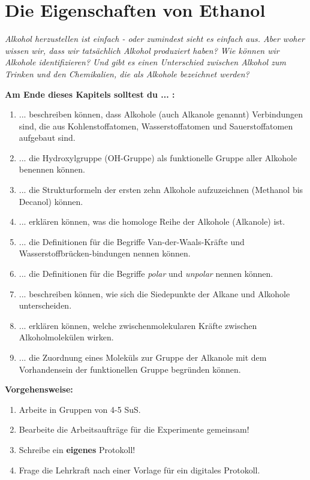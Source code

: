 \documentclass{scrartcl}  %
\begin{document}
\newpage

		\section{Die Eigenschaften von Ethanol}

			\textit{Alkohol herzustellen ist einfach - oder zumindest sieht es einfach aus. Aber woher wissen wir, dass wir tatsächlich Alkohol produziert haben? Wie können wir Alkohole identifizieren? Und gibt es einen Unterschied zwischen Alkohol zum Trinken und den Chemikalien, die als Alkohole bezeichnet werden?} \newline
			
			\begin{minipage}{0.7\textwidth}
				\noindent \textbf{Am Ende dieses Kapitels solltest du ... :}
				\begin{enumerate}
					\item ... beschreiben können, dass Alkohole (auch Alkanole genannt) Verbindungen sind, die aus Kohlenstoffatomen, Wasserstoffatomen und Sauerstoffatomen aufgebaut sind.
					\item ... die Hydroxylgruppe (OH-Gruppe) als funktionelle Gruppe aller Alkohole benennen können.
					\item ... die Strukturformeln der ersten zehn Alkohole aufzuzeichnen (Methanol bis Decanol) können. 
					\item ... erklären können, was die homologe Reihe der Alkohole (Alkanole) ist.
					\item ... die Definitionen für die Begriffe Van-der-Waals-Kräfte und Wasserstoffbrücken-bindungen nennen können.
					\item ... die Definitionen für die Begriffe \textit{polar} und \textit{unpolar} nennen können.
					\item ... beschreiben können, wie sich die Siedepunkte der Alkane und Alkohole unterscheiden.
					\item ... erklären können, welche zwischenmolekularen Kräfte zwischen Alkoholmolekülen wirken.
					\item ... die Zuordnung eines Moleküls zur Gruppe der Alkanole mit dem Vorhandensein der funktionellen Gruppe begründen können.
				\end{enumerate}	
			
				\noindent \textbf{Vorgehensweise:}
				\begin{enumerate}
					\item Arbeite in Gruppen von 4-5 SuS.
					\item Bearbeite die Arbeitsaufträge für die Experimente gemeinsam!
					\item Schreibe ein \textbf{eigenes} Protokoll!
					\item Frage die Lehrkraft nach einer Vorlage für ein digitales Protokoll.
				\end{enumerate}	
			\end{minipage}
\end{document}
